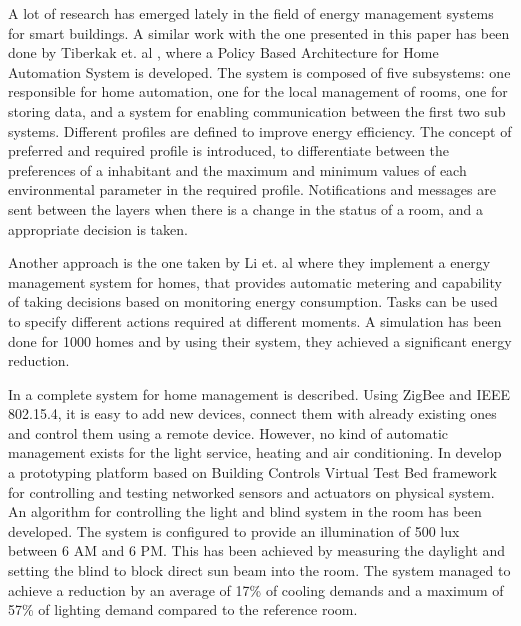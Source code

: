 \label{chap:relatedwork}
A lot of research has emerged lately in the field of energy management systems for smart buildings. 
A similar work with the one presented in this paper has been done by Tiberkak et. al \cite{Tiberkak10}, where a Policy Based Architecture for Home Automation
System is developed. The system is composed of five subsystems: one responsible
for home automation, one for the local management of rooms, one
for storing data, and a system for enabling communication between the first
two sub systems. Different profiles are defined to improve energy efficiency.
The concept of preferred and required profile is introduced, to differentiate
between the preferences of a inhabitant and the maximum and minimum values
of each environmental parameter in the required profile. Notifications
and messages are sent between the layers when there is a change in the
status of a room, and a appropriate decision is taken.

Another approach is the one taken by Li et. al \cite{Li11} where they implement a energy management system for homes, that provides automatic metering and capability of taking decisions based on monitoring energy consumption. 
Tasks can be used to specify different actions required at different moments. A simulation has been done for 1000 homes and by using their system, they achieved a significant energy reduction.

In \cite{Han10} a complete system for home management is described. Using ZigBee and IEEE 802.15.4, it is easy to add new devices, connect them with already existing ones and control them using a remote device. However, no kind of automatic management exists for the light service, heating and air conditioning. In \cite{Wen11} develop a prototyping platform based on Building Controls Virtual Test Bed framework \cite{Bcvtb} for controlling and testing networked sensors and actuators on physical system. An algorithm for controlling the light and blind system in the room has been developed. The system is configured to provide an illumination of 500 lux between 6 AM and 6 PM. This has been achieved by measuring the daylight and setting the blind to block direct sun beam into the room. The system managed to achieve a reduction by an average of 17\% of cooling demands and a maximum of 57\% of lighting demand compared to the reference room.

